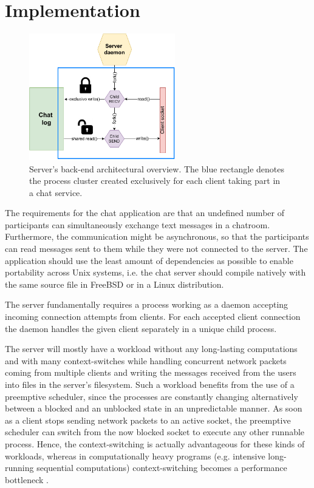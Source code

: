\section{Implementation}
\begin{figure}[!t]
	\centering
	\includegraphics[width=2.5in]{img/server.pdf}
	\caption{Server's back-end architectural overview. The blue rectangle denotes the process cluster created exclusively for each client taking part in a chat service.}
	\label{fig_server_backend}
\end{figure}
The requirements for the chat application are that an undefined number of participants can simultaneously exchange text messages in a chatroom. Furthermore, the communication might be asynchronous, so that the participants can read messages sent to them while they were not connected to the server. The application should use the least amount of dependencies as possible to enable portability across Unix systems, i.e. the chat server should compile natively with the same source file in FreeBSD or in a Linux distribution.

The server fundamentally requires a process working as a daemon accepting incoming connection attempts from clients. For each accepted client connection the daemon handles the given client separately in a unique child process.

The server will mostly have a workload without any long-lasting computations and with many context-switches while handling concurrent network packets coming from multiple clients and writing the messages received from the users into files in the server's filesystem. Such a workload benefits from the use of a preemptive scheduler, since the processes are constantly changing alternatively between a blocked and an unblocked state in an unpredictable manner. As soon as a client stops sending network packets to an active socket, the preemptive scheduler can switch from the now blocked socket to execute any other runnable process. Hence, the context-switching is actually advantageous for these kinds of workloads, whereas in computationally heavy programs (e.g. intensive long-running sequential computations) context-switching becomes a performance bottleneck \cite{Kennedy2018}.

